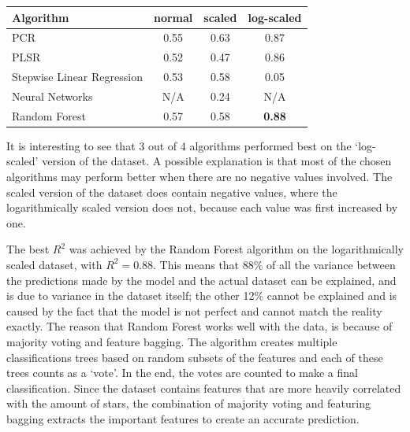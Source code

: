         \begin{center}
        \begin{tabular}[width=250pt]{|l|c|c|c|}

            \hline
            Algorithm                   & normal    & scaled   & log-scaled \\ \hline
            PCR                         &   0.55    & 0.63     & 0.87          \\
            PLSR                        &   0.52    & 0.47     & 0.86          \\
            Stepwise Linear Regression  &   0.53    & 0.58     & 0.05         \\
            Neural Networks             &   N/A     &   0.24   & N/A               \\
            Random Forest\footnotemark  &   0.57    & 0.58     & \textbf{0.88} \\
            \hline
        \end{tabular}
        \label{table:r-squared-table}
        \end{center}
        
        
        It is interesting to see that 3 out of 4 algorithms performed best on the `log-scaled' version of the dataset. A possible explanation is that most of the chosen algorithms may perform better when there are no negative values involved. The scaled version of the dataset does contain negative values, where the logarithmically scaled version does not, because each value was first increased by one.
        
        The best $R^2$ was achieved by the Random Forest algorithm on the logarithmically scaled dataset, with $R^2 = 0.88$. This means that 88\% of all the variance between the predictions made by the model and the actual dataset can be explained, and is due to variance in the dataset itself; the other 12\% cannot be explained and is caused by the fact that the model is not perfect and cannot match the reality exactly.
        The reason that Random Forest \cite{breiman-2001} works well with the data, is because of majority voting and feature bagging.
        The algorithm creates multiple classifications trees based on random subsets of the features and each of these trees counts as a `vote'.
        In the end, the votes are counted to make a final classification.
        Since the dataset contains features that are more heavily correlated with the amount of stars, the combination of majority voting and featuring bagging extracts the important features to create an accurate prediction.
                

